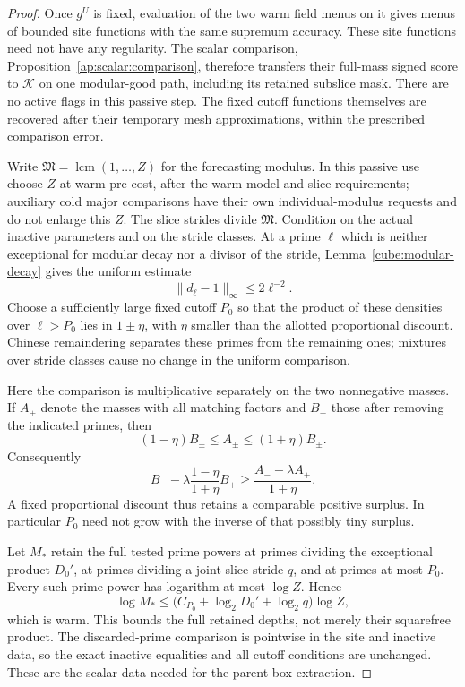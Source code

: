 \begin{proof}
Once $g^U$ is fixed, evaluation of the two warm field menus on it
gives menus of bounded site functions with the same supremum
accuracy.  These site functions need not have any regularity.
The scalar comparison, Proposition~\ref{ap:scalar:comparison},
therefore transfers their full-mass signed score to $\mathcal K$
on one modular-good path, including its retained subslice mask.
There are no active flags in this passive step.  The fixed cutoff
functions themselves are recovered after their temporary mesh
approximations, within the prescribed comparison error.

Write $\mathfrak M=\operatorname{lcm}(1,\ldots,Z)$ for the
forecasting modulus.  In this passive use choose $Z$ at warm-pre
cost, after the warm model and slice requirements; auxiliary cold
major comparisons have their own individual-modulus requests and
do not enlarge this $Z$.  The slice strides divide $\mathfrak M$.
Condition on the actual inactive parameters and on the stride
classes.  At a prime $\ell$ which is neither exceptional for
modular decay nor a divisor of the stride, Lemma~\ref{cube:modular-decay}
gives the uniform estimate
\[
                         \|d_\ell-1\|_\infty\leq2\ell^{-2}.
\]
Choose a sufficiently large fixed cutoff $P_0$ so that the product
of these densities over $\ell>P_0$ lies in $1\pm\eta$, with $\eta$
smaller than the allotted proportional discount.  Chinese
remaindering separates these primes from the remaining ones;
mixtures over stride classes cause no change in the uniform
comparison.

Here the comparison is multiplicative separately on the two
nonnegative masses.  If $A_\pm$ denote the masses with all matching
factors and $B_\pm$ those after removing the indicated primes, then
\[
 (1-\eta)B_\pm\leq A_\pm\leq(1+\eta)B_\pm.
\]
Consequently
\[
 B_--\lambda\frac{1-\eta}{1+\eta}B_+
 \geq\frac{A_--\lambda A_+}{1+\eta}.
\]
A fixed proportional discount thus retains a comparable positive
surplus.  In particular $P_0$ need not grow with the inverse of
that possibly tiny surplus.

Let $M_*$ retain the full tested prime powers at primes dividing
the exceptional product $D_0'$, at primes dividing a joint slice
stride $q$, and at primes at most $P_0$.  Every such prime power
has logarithm at most $\log Z$.  Hence
\[
 \log M_*
 \leq\bigl(C_{P_0}+\log_2 D_0'+\log_2 q\bigr)\log Z,
\]
which is warm.  This bounds the full retained depths, not merely
their squarefree product.  The discarded-prime comparison is
pointwise in the site and inactive data, so the exact inactive
equalities and all cutoff conditions are unchanged.  These are
the scalar data needed for the parent-box extraction.
\end{proof}

